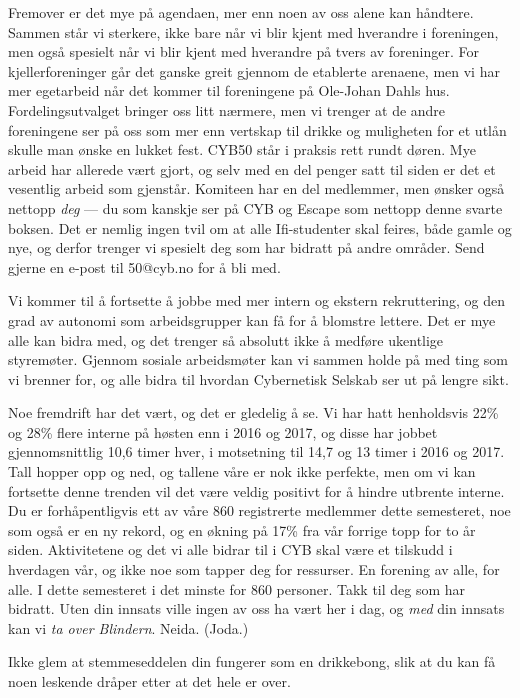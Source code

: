 \documentclass[10pt,norsk,a4paper]{article}
\begin{document}
\begin{multicols}{2}
Fremover er det mye på agendaen, mer enn noen av oss alene kan håndtere. Sammen står vi sterkere, ikke bare når vi blir kjent med hverandre i foreningen, men også spesielt når vi blir kjent med hverandre på tvers av foreninger. For kjellerforeninger går det ganske greit gjennom de etablerte arenaene, men vi har mer egetarbeid når det kommer til foreningene på Ole-Johan Dahls hus. Fordelingsutvalget bringer oss litt nærmere, men vi trenger at de andre foreningene ser på oss som mer enn vertskap til drikke og muligheten for et utlån skulle man ønske en lukket fest. CYB50 står i praksis rett rundt døren. Mye arbeid har allerede vært gjort, og selv med en del penger satt til siden er det et vesentlig arbeid som gjenstår. Komiteen har en del medlemmer, men ønsker også nettopp \textit{deg} --- du som kanskje ser på CYB og Escape som nettopp denne svarte boksen. Det er nemlig ingen tvil om at alle Ifi-studenter skal feires, både gamle og nye, og derfor trenger vi spesielt deg som har bidratt på andre områder. Send gjerne en e-post til 50@cyb.no for å bli med.

Vi kommer til å fortsette å jobbe med mer intern og ekstern rekruttering, og den grad av autonomi som arbeidsgrupper kan få for å blomstre lettere. Det er mye alle kan bidra med, og det trenger så absolutt ikke å medføre ukentlige styremøter. Gjennom sosiale arbeidsmøter kan vi sammen holde på med ting som vi brenner for, og alle bidra til hvordan Cybernetisk Selskab ser ut på lengre sikt.

Noe fremdrift har det vært, og det er gledelig å se. Vi har hatt henholdsvis 22\% og 28\% flere interne på høsten enn i 2016 og 2017, og disse har jobbet gjennomsnittlig 10,6 timer hver, i motsetning til 14,7 og 13 timer i 2016 og 2017. Tall hopper opp og ned, og tallene våre er nok ikke perfekte, men om vi kan fortsette denne trenden vil det være veldig positivt for å hindre utbrente interne. Du er forhåpentligvis ett av våre 860 registrerte medlemmer dette semesteret, noe som også er en ny rekord, og en økning på 17\% fra vår forrige topp for to år siden. Aktivitetene og det vi alle bidrar til i CYB skal være et tilskudd i hverdagen vår, og ikke noe som tapper deg for ressurser. En forening av alle, for alle. I dette semesteret i det minste for 860 personer.
Takk til deg som har bidratt. Uten din innsats ville ingen av oss ha vært her i dag, og \textit{med} din innsats kan vi \textit{ta over Blindern}. Neida. (Joda.)
\end{multicols}

Ikke glem at stemmeseddelen din fungerer som en drikkebong, slik at du kan få noen leskende dråper etter at det hele er over. 
\end{document}

